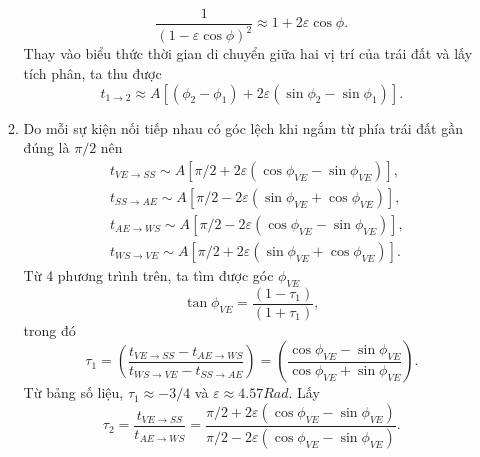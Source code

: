\begin{enumerate}[label=\textbf{\arabic*,}]
\begin{enumerate}[label=\textbf{\alph*,}]
\begin{equation}
            \dfrac{1}{\left( 1 - \varepsilon \cos \phi \right)^2} \approx 1 + 2 \varepsilon \cos \phi.
        \end{equation}
        Thay vào biểu thức thời gian di chuyển giữa hai vị trí của trái đất và lấy tích phân, ta thu được
        \begin{equation} \label{eq8_Earth_eccentricity}
            t_{1 \rightarrow 2} \approx A[(\phi_2 - \phi_1) + 2\varepsilon(\sin{\phi_2} - \sin{\phi_1})].
        \end{equation}
        \item Do mỗi sự kiện nối tiếp nhau có góc lệch khi ngắm từ phía trái đất gần đúng là $\pi/2$ nên
        \begin{align}
        & t_{V E \rightarrow S S} \sim A\left[\pi / 2+2 \varepsilon\left(\cos \phi_{V E}-\sin \phi_{V E}\right)\right], \\
        & t_{S S \rightarrow A E} \sim A\left[\pi / 2-2 \varepsilon\left(\sin \phi_{V E}+\cos \phi_{V E}\right)\right], \\
        & t_{A E \rightarrow W S} \sim A\left[\pi / 2-2 \varepsilon\left(\cos \phi_{V E}-\sin \phi_{V E}\right)\right], \\
        & t_{W S \rightarrow V E} \sim A\left[\pi / 2+2 \varepsilon\left(\sin \phi_{V E}+\cos \phi_{V E}\right)\right] .
        \end{align}
        Từ 4 phương trình trên, ta tìm được góc $\phi_{VE}$
        \begin{equation} \label{eq13_Earth_eccentricity}
            \tan \phi_{V E}=\frac{\left(1-\tau_{1}\right)}{\left(1+\tau_{1}\right)},
        \end{equation}
        trong đó
        \begin{equation} \label{eq14_Earth_eccentricity}
            \tau_{1}=\left(\frac{t_{V E \rightarrow S S}-t_{A E \rightarrow W S}}{t_{W S \rightarrow V E}-t_{S S \rightarrow A E}}\right)=\left(\frac{\cos \phi_{V E}-\sin \phi_{V E}}{\cos \phi_{V E}+\sin \phi_{V E}}\right).
        \end{equation}
        Từ bảng số liệu, $\tau_1 \approx -3/4$ và $\varepsilon \approx 4.57 \si{Rad}$.
        Lấy
        \begin{equation} \label{eq15_Earth_eccentricity}
            \tau_{2}=\frac{t_{V E \rightarrow S S}}{t_{A E \rightarrow W S}} = \dfrac{\pi / 2+2 \varepsilon\left(\cos \phi_{V E}-\sin \phi_{V E}\right)}{\pi / 2-2 \varepsilon\left(\cos \phi_{V E}-\sin \phi_{V E}\right)}.
        \end{equation}

\end{enumerate}
\end{enumerate}
